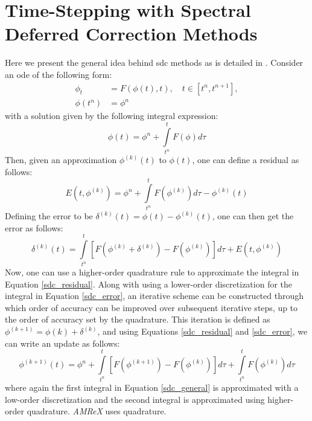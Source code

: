 \section{Time-Stepping with Spectral Deferred Correction Methods}
Here we present the general idea behind \gls{sdc} methods as is detailed in \cite{MISDC_general}. Consider an \gls{ode} of the following form: 
\begin{equation} \label{toy_ode}
\begin{split}
\phi_t &= F(\phi(t), t), \quad t \in [t^n, t^{n+1}], \\
\phi(t^n) &= \phi^n 
\end{split}
\end{equation}
with a solution given by the following integral expression:
\begin{equation}
\phi(t) = \phi^n + \int\limits_{t^n}^{t} F(\phi) d\tau
\end{equation}
Then, given an approximation $\phi^{(k)}(t)$ to $\phi(t)$, one can define a residual as follows:
\begin{equation} \label{sdc_residual}
E(t, \phi^{(k)}) = \phi^n + \int\limits_{t^n}^t  F(\phi^{(k)}) d\tau - \phi^{(k)}(t)
\end{equation}
Defining the error to be $\delta^{(k)}(t) = \phi(t) - \phi^{(k)}(t)$, one can then get the error as follows:
\begin{equation} \label{sdc_error}
\delta^{(k)}(t) = \int\limits_{t^n}^{t} \left[ F(\phi^{(k)} + \delta^{(k)}) - F(\phi^{(k)}) \right] d\tau + E(t, \phi^{(k)})
\end{equation}
Now, one can use a higher-order quadrature rule to approximate the integral in Equation \ref{sdc_residual}. Along with using a lower-order discretization for the integral in Equation \ref{sdc_error}, an iterative scheme can be constructed through which order of accuracy can be improved over subsequent iterative steps, up to the order of accuracy set by the quadrature. This iteration is defined as $\phi^{(k+1)} = \phi{(k)} + \delta^{(k)}$, and using Equations \ref{sdc_residual} and \ref{sdc_error}, we can write an update as follows:
\begin{equation} \label{sdc_general}
\phi^{(k+1)}(t) = \phi^n + \int\limits_{t^n}^{t} \left[ F(\phi^{(k+1)}) - F(\phi^{(k)}) \right] d\tau + \int\limits_{t^n}^{t}F(\phi^{(k)}) d\tau
\end{equation}
where again the first integral in Equation \ref{sdc_general} is approximated with a low-order discretization and the second integral is approximated using higher-order quadrature. \textit{AMReX} uses quadrature. 

